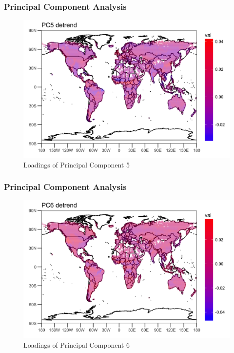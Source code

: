 \documentclass{beamer}
\begin{document}
\begin{frame}
\frametitle{Principal Component Analysis}
\begin{figure}
	\centering
	\includegraphics[width=0.9\linewidth]{../img/loading_PC5_de}
	\caption{Loadings of Principal Component 5}
	\label{fig:loadingpc5}
\end{figure}
\end{frame}

\begin{frame}
\frametitle{Principal Component Analysis}
\begin{figure}
	\centering
	\includegraphics[width=0.9\linewidth]{../img/loading_PC6_de}
	\caption{Loadings of Principal Component 6}
	\label{fig:loadingpc6}
\end{figure}
\end{frame}
\end{document}
